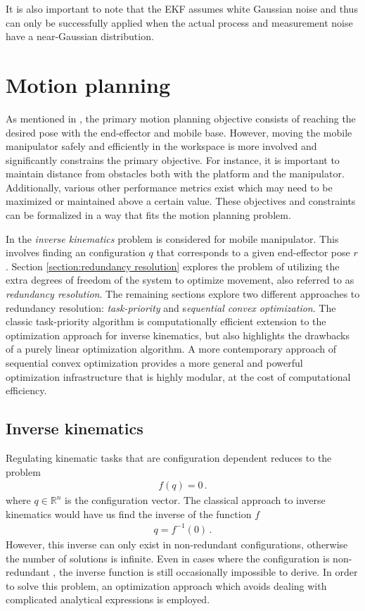 \documentclass[times, utf8, diplomski, english]{fer}
\begin{document}
It is also important to note that the EKF assumes white Gaussian noise and thus can only be successfully applied when the actual process and measurement noise have a near-Gaussian distribution.


\chapter{Motion planning}\label{chapter:motion planning}
As mentioned in , the primary motion planning objective consists of reaching the desired pose with the end-effector and mobile base.
However, moving the mobile manipulator safely and efficiently in the workspace is more involved and significantly constrains the primary objective. 
For instance, it is important to maintain distance from obstacles both with the platform and the manipulator.
Additionally, various other performance metrics exist which may need to be maximized or maintained above a certain value.
These objectives and constraints can be formalized in a way that fits the motion planning problem.

In  the \textit{inverse kinematics} problem is considered for mobile manipulator.
This involves finding an configuration $q$ that corresponds to a given end-effector pose $r$.
Section \ref{section:redundancy resolution} explores the problem of utilizing the extra degrees of freedom of the system to optimize movement, also referred to as \textit{redundancy resolution}.
The remaining sections explore two different approaches to redundancy resolution: \textit{task-priority} and s\textit{equential convex optimization}. 
The classic task-priority algorithm is computationally efficient extension to the optimization approach for inverse kinematics, but also highlights the drawbacks of a purely linear optimization algorithm.
A more contemporary approach of sequential convex optimization provides a more general and powerful optimization infrastructure that is highly modular, at the cost of computational efficiency.
\section{Inverse kinematics}\label{section:inverse kinematics}
Regulating kinematic tasks that are configuration dependent reduces to the problem
\begin{align}
f\left(q\right) = 0 \, . %
\end{align}
where $q \in \mathbb{R}^{n} $  is the configuration vector. 
The classical approach to inverse kinematics would have us find the inverse of the function $f$
\begin{align}
q = f^{-1}\left(0\right)\, . \label{eq:inverse}
\end{align}
However, this inverse can only exist in non-redundant configurations, otherwise the number of solutions is infinite.
Even in cases where the configuration is non-redundant , the inverse function is still occasionally impossible to derive.
In order to solve this problem, an optimization approach which avoids dealing with complicated analytical expressions is employed.
\end{document}
